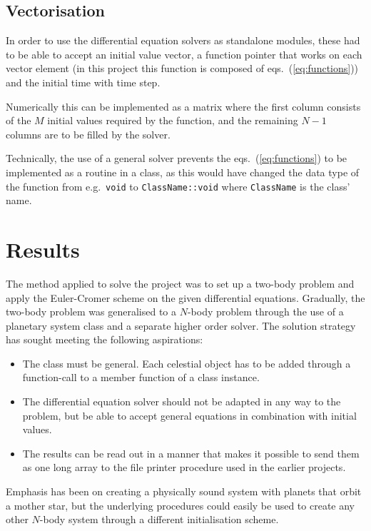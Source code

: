 \documentclass[a4paper,11pt]{article}
\begin{document}
\subsection{Vectorisation}
In order to use the differential equation solvers as standalone modules, these had to be able to accept an initial value vector, a function pointer that works on each vector element (in this project this function is composed of eqs.~(\ref{eq:functions})) and the initial time with time step. 

Numerically this can be implemented as a matrix where the first column consists of the $M$ initial values required by the function, and the remaining $N-1$ columns are to be filled by the solver. 

Technically, the use of a general solver prevents the eqs.~(\ref{eq:functions}) to be implemented as a routine in a class, as this would have changed the data type of the function from e.g.~\texttt{void} to \texttt{ClassName::void} where \texttt{ClassName} is the class' name.


\section{Results}
The method applied to solve the project was to set up a two-body problem and apply the Euler-Cromer scheme on the given differential equations. Gradually, the two-body problem was generalised to a $N$-body problem through the use of a planetary system class and a separate higher order solver. The solution strategy has sought meeting the following aspirations:
\begin{itemize}
    \item The class must be general. Each celestial object has to be added through a function-call to a member function of a class instance. 
    \item The differential equation solver should not be adapted in any way to the problem, but be able to accept general equations in combination with initial values. 
    \item The results can be read out in a manner that makes it possible to send them as one long array to the file printer procedure used in the earlier projects.
\end{itemize}

Emphasis has been on creating a physically sound system with planets that orbit a mother star, but the underlying procedures could easily be used to create any other $N$-body system through a different initialisation scheme. 
\end{document}
